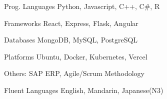 

\begin{cvskills}

  \cvskill
  {Prog. Languages} %
  {} %
  {Python, Javascript, C++, C\#, R} %

  \cvskill
  {Frameworks} %
  {} %
  {React, Express, Flask, Angular} %

  \cvskill
  {Databases} %
  {} %
  {MongoDB, MySQL, PostgreSQL} %

  \cvskill
  {Platforms} %
  {} %
  {Ubuntu, Docker, Kubernetes, Vercel} %


  \cvskill
  {Others:} %
  {} %
  {SAP ERP, Agile/Scrum Methodology} %

  \cvskill
  {Fluent Languages} %
  {} %
  {English, Mandarin, Japanese(N3)} %

\end{cvskills}
